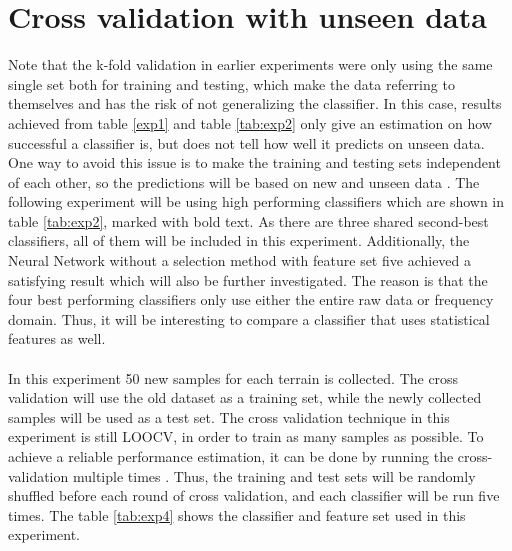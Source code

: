 \documentclass[USenglish]{ifimaster}  %
\begin{document}
\section{Cross validation with unseen data} \label{seq:crossunseen}
Note that the k-fold validation in earlier experiments were only using the same single set both for training and testing, which make the data referring to themselves and has the risk of not generalizing the classifier. In this case, results achieved from table \ref{exp1} and table \ref{tab:exp2} only give an estimation on how successful a classifier is, but does not tell how well it predicts on unseen data. One way to avoid this issue is to make the training and testing sets independent of each other, so the predictions will be based on new and unseen data \cite{26b23e912c654fe4b7478fd910130195}. The following experiment will be using high performing classifiers which are shown in table \ref{tab:exp2}, marked with bold text. As there are three shared second-best classifiers, all of them will be included in this experiment. Additionally, the Neural Network without a selection method with feature set five achieved a satisfying result which will also be further investigated. The reason is that the four best performing classifiers only use either the entire raw data or frequency domain. Thus, it will be interesting to compare a classifier that uses statistical features as well.
\\
\\
In this experiment 50 new samples for each terrain is collected. The cross validation will use the old dataset as a training set, while the newly collected samples will be used as a test set. The cross validation technique in this experiment is still LOOCV, in order to train as many samples as possible. To achieve a reliable performance estimation, it can be done by running the cross-validation multiple times \cite{Refaeilzadeh2009}. Thus, the training and test sets will be randomly shuffled before each round of cross validation, and each classifier will be run five times. The table \ref{tab:exp4} shows the classifier and feature set used in this experiment.
\end{document}
